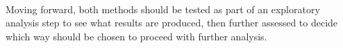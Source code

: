 \documentclass[10pt,twocolumn,letterpaper]{article}
\begin{document}
	\paragraph{} Moving forward, both methods should be tested as part of an exploratory analysis step to see what results are produced, then further assessed to decide which way should be chosen to proceed with further analysis. 
	
	{\small
		
		
	}
	
\end{document}
